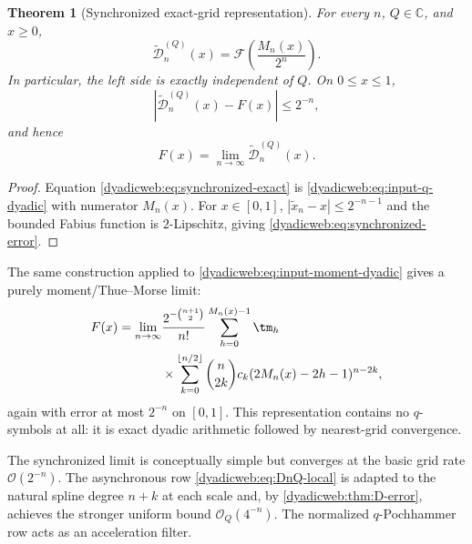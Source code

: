 \documentclass[11pt,oneside]{article}
\newtheorem{theorem}{Theorem}[section]
\theoremstyle{definition}
\theoremstyle{remark}
\newcommand{\C}{\mathbb C}
\newcommand{\bigO}{\mathcal O}
\begin{document}
\begin{theorem}[Synchronized exact-grid representation]
\label{dyadicweb:thm:synchronized}
For every $n$, $Q\in\C$, and $x\ge0$,
\begin{equation}
 \boxed{
 \widetilde{\mathcal D}_n^{(Q)}(x)
 =\mathcal F\!\left(\frac{M_n(x)}{2^n}\right).}           \label{dyadicweb:eq:synchronized-exact}
\end{equation}
In particular, the left side is exactly independent of $Q$.  On $0\le x\le1$,
\begin{equation}
 \left|\widetilde{\mathcal D}_n^{(Q)}(x)-F(x)\right|
 \le2^{-n},                                                \label{dyadicweb:eq:synchronized-error}
\end{equation}
and hence
\begin{equation}
 F(x)=\lim_{n\to\infty}\widetilde{\mathcal D}_n^{(Q)}(x). \label{dyadicweb:eq:synchronized-limit}
\end{equation}
\end{theorem}

\begin{proof}
Equation \eqref{dyadicweb:eq:synchronized-exact} is
\eqref{dyadicweb:eq:input-q-dyadic} with numerator $M_n(x)$.  For $x\in[0,1]$,
$|\widetilde x_n-x|\le2^{-n-1}$ and the bounded Fabius function is $2$-Lipschitz, giving
\eqref{dyadicweb:eq:synchronized-error}.
\end{proof}

The same construction applied to \eqref{dyadicweb:eq:input-moment-dyadic} gives a purely
moment/Thue--Morse limit:
\begin{align}
 F(x)=\lim_{n\to\infty}
 &\frac{2^{-\binom{n+1}{2}}}{n!}
 \sum_{h=0}^{M_n(x)-1}\tm_h                              \notag\\
 &\times\sum_{k=0}^{\lfloor n/2\rfloor}
 \binom n{2k}c_k(2M_n(x)-2h-1)^{n-2k},                   \label{dyadicweb:eq:synchronized-moment-limit}
\end{align}
again with error at most $2^{-n}$ on $[0,1]$.  This representation contains no $q$-symbols at
all: it is exact dyadic arithmetic followed by nearest-grid convergence.

The synchronized limit is conceptually simple but converges at the basic grid rate
$\bigO(2^{-n})$.  The asynchronous row \eqref{dyadicweb:eq:DnQ-local} is adapted to the natural spline
degree $n+k$ at each scale and, by \cref{dyadicweb:thm:D-error}, achieves the stronger uniform bound
$\bigO_Q(4^{-n})$.  The normalized $q$-Pochhammer row acts as an acceleration filter.
\end{document}
